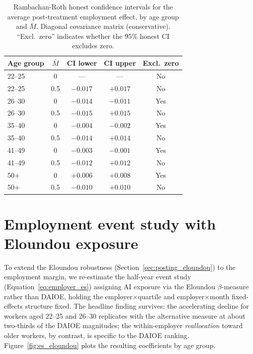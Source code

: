 \documentclass[preprint,12pt,authoryear]{elsarticle}
\begin{document}
\begin{table}[htbp]
\centering
\caption{Rambachan-Roth honest confidence intervals for the average
post-treatment employment effect, by age group and $\bar{M}$. Diagonal
covariance matrix (conservative). ``Excl.\ zero'' indicates whether the
95\% honest CI excludes zero.}
\label{tab:rr_employment}
\footnotesize
\begin{tabular}{@{}lcccc@{}}
\toprule
Age group & $\bar{M}$ & CI lower & CI upper & Excl.\ zero \\
\midrule
22--25 & 0   & ---    & ---    & No \\
22--25 & 0.5 & $-0.017$ & $+0.017$ & No \\
\midrule
26--30 & 0   & $-0.014$ & $-0.011$ & Yes \\
26--30 & 0.5 & $-0.015$ & $+0.015$ & No \\
\midrule
35--40 & 0   & $-0.004$ & $-0.002$ & Yes \\
35--40 & 0.5 & $-0.014$ & $+0.014$ & No \\
\midrule
41--49 & 0   & $-0.003$ & $-0.001$ & Yes \\
41--49 & 0.5 & $-0.012$ & $+0.012$ & No \\
\midrule
50+    & 0   & $+0.006$ & $+0.008$ & Yes \\
50+    & 0.5 & $-0.010$ & $+0.010$ & No \\
\bottomrule
\end{tabular}
\end{table}

\section{Employment event study with Eloundou exposure}
\label{sec:eloundou_es}

To extend the Eloundou robustness (Section~\ref{sec:posting_eloundou}) to the employment margin, we re-estimate the half-year event study (Equation~\ref{eq:employer_es}) assigning AI exposure via the Eloundou $\beta$-measure rather than DAIOE, holding the employer$\times$quartile and employer$\times$month fixed-effects structure fixed. The headline finding survives: the accelerating decline for workers aged 22--25 and 26--30 replicates with the alternative measure at about two-thirds of the DAIOE magnitudes; the within-employer \emph{reallocation} toward older workers, by contrast, is specific to the DAIOE ranking. Figure~\ref{fig:es_eloundou} plots the resulting coefficients by age group.
\end{document}
